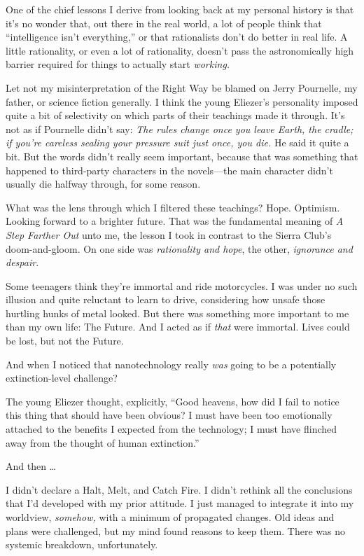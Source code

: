 {
 One of the chief lessons I derive from looking back at my personal
history is that it's no wonder that, out there in the
real world, a lot of people think that ``intelligence
isn't everything,'' or that
rationalists don't do better in real life. A little
rationality, or even a lot of rationality, doesn't pass
the astronomically high barrier required for things to actually start
\textit{working.}}

{
 Let not my misinterpretation of the Right Way be blamed on Jerry
Pournelle, my father, or science fiction generally. I think the young
Eliezer's personality imposed quite a bit of
selectivity on which parts of their teachings made it through.
It's not as if Pournelle didn't say:
\textit{The rules change once you leave Earth, the cradle; if
you're careless sealing your pressure suit just once,
you die.} He said it quite a bit. But the words didn't
really seem important, because that was something that happened to
third-party characters in the novels---the main character
didn't usually die halfway through, for some reason.}

{
 What was the lens through which I filtered these teachings? Hope.
Optimism. Looking forward to a brighter future. That was the
fundamental meaning of \textit{A Step Farther Out} unto me, the lesson
I took in contrast to the Sierra Club's doom-and-gloom.
On one side was \textit{rationality and hope}, the other,
\textit{ignorance and despair}.}

{
 Some teenagers think they're immortal and ride
motorcycles. I was under no such illusion and quite reluctant to learn
to drive, considering how unsafe those hurtling hunks of metal looked.
But there was something more important to me than my own life: The
Future. And I acted as if \textit{that} were immortal. Lives could be
lost, but not the Future.}

{
 And when I noticed that nanotechnology really \textit{was} going
to be a potentially extinction-level challenge?}

{
 The young Eliezer thought, explicitly, ``Good
heavens, how did I fail to notice this thing that should have been
obvious? I must have been too emotionally attached to the benefits I
expected from the technology; I must have flinched away from the
thought of human extinction.''}

{
 And then \ldots}

{
 I didn't declare a Halt, Melt, and Catch Fire. I
didn't rethink all the conclusions that
I'd developed with my prior attitude. I just managed to
integrate it into my worldview, \textit{somehow,} with a minimum of
propagated changes. Old ideas and plans were challenged, but my mind
found reasons to keep them. There was no systemic breakdown,
unfortunately.}

